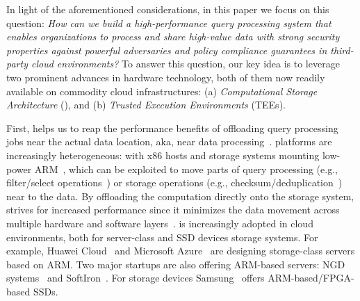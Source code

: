 In light of the aforementioned considerations, in this paper we focus on this question: \textit{How can we build a high-performance query processing system that enables organizations to process and share high-value data with strong security properties against powerful adversaries and policy compliance guarantees in third-party cloud environments?} To answer this question, our key idea is to leverage two prominent advances in hardware technology, both of them now readily available on commodity cloud infrastructures: (a) \textit{Computational Storage Architecture} (\csd), and (b) \textit{Trusted Execution Environments} (TEEs).


First, \csd helps us to reap the performance benefits of offloading query processing jobs near the actual data location, aka, near data processing~\cite{arm_storage,NGD}. %
\csd platforms are increasingly heterogeneous: with x86 hosts and storage systems mounting low-power ARM~\cite{gu2016,blockNDP, NGD,huaweiStorage}, which can be exploited to move parts of query processing (e.g., filter/select operations~\cite{gu2016,blockNDP}) or storage operations (e.g., checksum/deduplication~\cite{234725, bhatotia2012}) near to the data. 
By offloading the computation directly onto the storage system, \csd strives for increased performance since it minimizes the data movement across multiple hardware and software layers~\cite{10.1145/3102980.3102990,blockNDP,do2013, huaweiStorage}. \csd is increasingly adopted in cloud environments, both for server-class and SSD devices storage systems. For example, Huawei Cloud~\cite{huaweiStorage} and Microsoft Azure~\cite{leapio} are designing \csd storage-class servers based on ARM. Two major startups are also offering ARM-based \csd servers: NGD systems~\cite{NGD} and SoftIron~\cite{softiron}. For storage devices Samsung~\cite{Samsung} offers ARM-based/FPGA-based SSDs.

